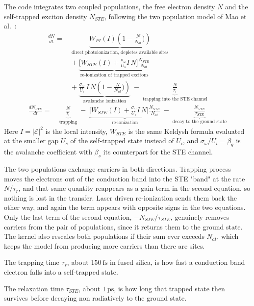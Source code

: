 The code integrates two coupled populations, the free electron density $N$ and the self-trapped exciton density $N_{STE}$, following the two population model of Mao et al.~\cite{mao2004}:
\begin{align}
\label{eq:rate_N}
\frac{dN}{dt} =\;
&\underbrace{W_{PI}(I)\left(1-\frac{N}{N_{at}})\right)}_{\text{direct photoionization, depletes available sites}} \nonumber\\[4pt]
&+\;\underbrace{\Big[W_{STE}(I)+\frac{\sigma_\omega}{U_s} I\, N\Big]\frac{N_{STE}}{N_{at}}}_{\text{re-ionization of trapped excitons}} \nonumber\\[4pt]
&+\;\underbrace{\frac{\sigma_\omega}{U_i}\, I\, N\left(1-\frac{N}{N_{at}})\right)}_{\text{avalanche ionization}}
\;-\;\underbrace{\frac{N}{\tau_r}}_{\text{trapping into the STE channel}}
\end{align}
\begin{align}
\label{eq:rate_NSTE}
\frac{dN_{STE}}{dt} =\;
&\underbrace{\frac{N}{\tau_r}}_{\text{trapping}}
\;-\;\underbrace{\Big[W_{STE}(I)+\frac{\sigma_\omega}{U_s} I\, N\Big]\frac{N_{STE}}{N_{at}}}_{\text{re-ionization}}
\;-\;\underbrace{\frac{N_{STE}}{\tau_{STE}}}_{\text{decay to the ground state}}
\end{align}
Here $I=|\mathcal{E}|^2$ is the local intensity, $W_{STE}$ is the same Keldysh formula evaluated at the smaller gap $U_s$ of the self-trapped state instead of $U_i$, and $\sigma_\omega/U_i =\beta_g$ is the avalanche coefficient with $\beta_s$ its counterpart for the STE channel.

The two populations exchange carriers in both directions. Trapping process moves the electrons out of the conduction band into the STE "band" at the rate $N/\tau_r$, and that same quantity reappears as a gain term in the second equation, so nothing is lost in the transfer. Laser driven re-ionization sends them back the other way, and again the term appears with opposite signs in the two equations. Only the last term of the second equation, $-N_{STE}/\tau_{STE}$, genuinely removes carriers from the pair of populations, since it returns them to the ground state. The kernel also rescales both populations if their sum ever exceeds $N_{at}$, which keeps the model from producing more carriers than there are sites.
\newline

The trapping time $\tau_r$, about $150\ \text{fs}$ in fused silica, is how fast a conduction band electron falls into a self-trapped state.

The relaxation time $\tau_{STE}$, about $1\ \text{ps}$, is how long that trapped state then survives before decaying non radiatively to the ground state. 

